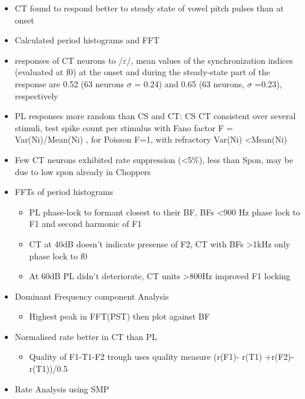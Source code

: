 \documentclass[10pt,a4paper]{article}
\begin{document}
\begin{itemize}
\item CT found to respond better to steady state of vowel pitch pulses than at
  onset
\item Calculated period histograms and FFT
\item responses of CT neurons to /$\varepsilon $/, mean values of the
  synchronization indices (evaluated at f0) at the onset and during the
  steady-state part of the response are 0.52 (63 neurons $\sigma $ = 0.24) and
  0.65 (63 neurons, $\sigma $ =0.23), respectively
\item PL responses more random than CS and CT: CS CT consistent over several
  stimuli, test spike count per stimulus with Fano factor \citep{Teich:1989} F =
  Var(Ni)/Mean(Ni) , for Poisson F=1, with refractory Var(Ni)
  {\textless}Mean(Ni)
\item Few CT neurons exhibited rate suppression ({\textless}5\%), less than
  Spon, may be due to low spon already in Choppers \citep{RhodeGreenberg:1994b}
\item FFTs of period histograms

  \begin{itemize}
  \item PL phase-lock to formant closest to their BF, BFs {\textless}900 Hz
    phase lock to F1 and second harmonic of F1
  \item CT at 40dB doesn{\textquoteright}t indicate presense of F2, CT with BFs
    {\textgreater}1kHz only phase lock to f0
  \item At 60dB PL didn{\textquoteright}t deteriorate, CT units
    {\textgreater}800Hz improved F1 locking
  \end{itemize}
\item Dominant Frequency component Analysis \citep{SinexGeisler:1983}

  \begin{itemize}
  \item Highest peak in FFT(PST) then plot against BF
  \end{itemize}
\item Normalised rate better in CT than PL

  \begin{itemize}
  \item Quality of F1-T1-F2 trough uses quality measure (r(F1)- r(T1)
    +r(F2)-r(T1))/0.5
  \end{itemize}
\item Rate Analysis using SMP


\end{itemize}
\end{document}
